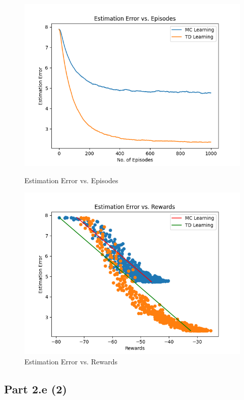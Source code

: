 \documentclass[12pt]{article}
\begin{document}
\begin{figure}[H]
  \centering
  \begin{minipage}[b]{0.4\textwidth}
    \includegraphics[width=\textwidth]{figures/2e1.png}
    \caption{Estimation Error vs. Episodes}
    \label{figure:2e1}
  \end{minipage}
  \hspace{3em}
  \begin{minipage}[b]{0.4\textwidth}
    \includegraphics[width=\textwidth]{figures/2e2.png}
    \caption{Estimation Error vs. Rewards}
    \label{figure:2e2}
  \end{minipage}
\end{figure}

\subsection*{Part 2.e (2)}
\end{document}
